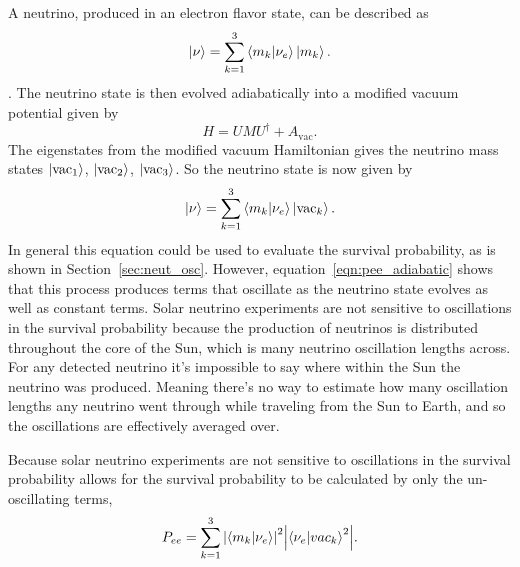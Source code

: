 A neutrino, produced in an electron flavor state, can be described as
\begin{equation}
    \ket{\nu} = \sum_{k=1}^{3}\braket{m_{k}}{\nu_{e}}\ket{m_{k}}\text{.}
\end{equation}.
The neutrino state is then evolved adiabatically into a modified
vacuum potential given by
\begin{equation}
    H = U M U^{\dagger} + A_{\mathrm{vac}}\text{.}
\end{equation}
The eigenstates from the modified vacuum Hamiltonian gives the neutrino mass
states $\ket{\mathrm{vac}_{1}}$, $\ket{\mathrm{vac}_{2}}$, $\ket{\mathrm{vac}_{3}}$.
So the neutrino state is now given by
\begin{equation}
    \ket{\nu} = \sum_{k=1}^{3}\braket{m_{k}}{\nu_{e}}\ket{\mathrm{vac}_{k}}\text{.}
\end{equation}
In general this equation could be used to evaluate the
survival probability, as is shown in Section~\ref{sec:neut_osc}.
However, equation~\ref{eqn:pee_adiabatic} shows that this process produces
terms that oscillate as the neutrino state evolves as well as constant
terms.
Solar neutrino experiments are not sensitive to oscillations in the survival
probability because the production of neutrinos is distributed
throughout the core of the Sun, which is many neutrino oscillation lengths
across.
For any detected neutrino
it's impossible to say where within the Sun the neutrino was produced.
Meaning there's no way to estimate how many oscillation lengths any neutrino
went through while traveling from the Sun to Earth, and so the oscillations
are effectively averaged over.


Because solar neutrino experiments are not sensitive to oscillations in
the survival probability allows for the survival probability to be calculated
by only the un-oscillating terms,
\begin{equation}
    P_{ee} = \sum_{k=1}^{3}\abs{\braket{m_{k}}{\nu_{e}}}^{2}\abs{\braket{\nu_{e}}{vac_{k}}^{2}}\text{.}
\end{equation}

